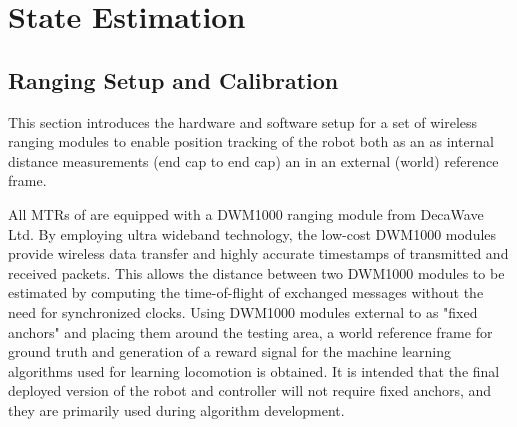 \chapter{State Estimation}
\label{state_estimation}


\section{Ranging Setup and Calibration}
\label{ranging}
\label{txt:ranging}
This section introduces the hardware and software setup for a set of wireless ranging modules to enable 
position tracking of the robot both as an as internal distance measurements (end cap to end cap) an in an external (world) reference frame.

All MTRs of \SB{} are equipped with a DWM1000 ranging module from DecaWave Ltd.
By employing ultra wideband technology, the low-cost DWM1000 modules provide wireless data transfer and highly accurate timestamps of transmitted and received packets. 
This allows the distance between two DWM1000 modules to be estimated by computing the time-of-flight of exchanged messages without the need for synchronized clocks.
Using DWM1000 modules external to \SB{} as "fixed anchors" and placing them around the testing area, a world reference frame for
 ground truth and generation of a reward signal for the machine learning algorithms used for learning locomotion is obtained.  
It is intended that the final deployed version of the robot and controller will not require fixed anchors, and they are primarily
used during algorithm development.


